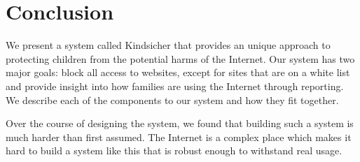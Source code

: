 
\section{Conclusion}

We present a system called Kindsicher that provides an unique approach to
protecting children from the potential harms of the Internet. Our system has
two major goals: block all access to websites, except for sites that are on a
white list and provide insight into how families are using the Internet through
reporting. We describe each of the components to our system and how they fit
together.

Over the course of designing the system, we found that building such a system
is much harder than first assumed. The Internet is a complex place which makes
it hard to build a system like this that is robust enough to withstand real
usage.


